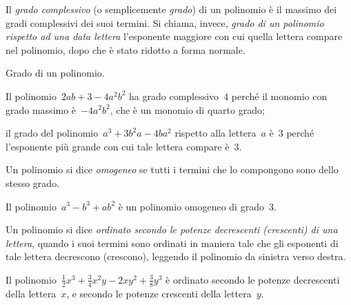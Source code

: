 \begin{definizione}
Il \emph{grado complessivo} (o semplicemente \emph{grado}) di un polinomio 
è il massimo dei gradi complessivi dei suoi
termini. Si chiama, invece, \emph{grado di un polinomio rispetto ad una 
data lettera} l'esponente maggiore con
cui quella lettera compare nel polinomio, dopo che è stato ridotto a forma 
normale.
\end{definizione}

\begin{exrig}
\begin{esempio} Grado di un polinomio.
\begin{itemize*}
\item Il polinomio~$2ab+3-4a^2b^2$ ha grado complessivo~$4$ perché il 
monomio con grado massimo è~$-4a^2b^2 $, che è un monomio di quarto grado;
\item il grado del polinomio~$a^3+3b^2a-4ba^2$ rispetto alla lettera~$a$ 
è~$3$ perché l'esponente più grande con cui tale lettera compare è~$3$.
\end{itemize*}
\end{esempio}
\end{exrig}


\begin{definizione}
Un polinomio si dice \emph{omogeneo} se tutti i termini che lo compongono 
sono dello stesso grado.
\end{definizione}

\begin{exrig}
\begin{esempio}
Il polinomio~$a^3-b^3+ab^2$ è un polinomio omogeneo di grado~$3$.
\end{esempio}
\end{exrig}


\begin{definizione}
Un polinomio si dice \emph{ordinato secondo le potenze decrescenti 
(crescenti) di una lettera}, quando i suoi
termini sono ordinati in maniera tale che gli esponenti di tale lettera 
decrescono (crescono), leggendo il
polinomio da sinistra verso destra.
\end{definizione}

\begin{exrig}
\begin{esempio}
Il polinomio~$\frac{1}{2}x^3+\frac{3}{4}x^2y-2xy^2+\frac{3}{8}y^3$ è 
ordinato secondo le potenze decrescenti della lettera~$x$, e secondo le 
potenze crescenti della lettera~$y$.
\end{esempio}
\end{exrig}

